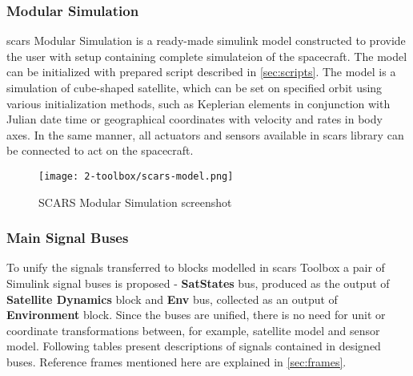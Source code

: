     \subsubsection{Modular Simulation}
        \ac{scars} Modular Simulation is a ready-made simulink model constructed to provide the user with setup containing complete simulateion of the spacecraft. The model can be initialized with prepared script described in \autoref{sec:scripts}. The model is a simulation of cube-shaped satellite, which can be set on specified orbit using various initialization methods, such as Keplerian elements in conjunction with Julian date time or geographical coordinates with velocity and rates in body axes. In the same manner, all actuators and sensors available in \ac{scars} library can be connected to act on the spacecraft.

        \begin{figure}[H]
            \centering
            \texttt{[image: 2-toolbox/scars-model.png]}
            \caption{SCARS Modular Simulation screenshot}
            \label{fig:scars-model}
        \end{figure}


    \subsubsection{Main Signal Buses}\label{sec:buses}
        To unify the signals transferred to blocks modelled in \ac{scars} Toolbox a pair of Simulink signal buses is proposed - \textbf{SatStates} bus, produced as the output of \textbf{Satellite Dynamics} block and \textbf{Env} bus, collected as an output of \textbf{Environment} block. Since the buses are unified, there is no need for unit or coordinate transformations between, for example, satellite model and sensor model. Following tables present descriptions of signals contained in designed buses. Reference frames mentioned here are explained in \autoref{sec:frames}. 
        

